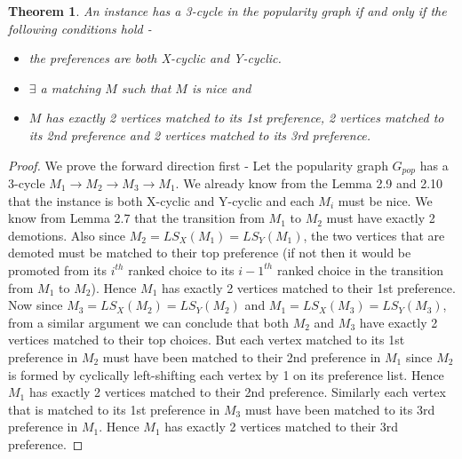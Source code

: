 \documentclass[a4paper,10pt]{article}
\theoremstyle{plain} %
\newtheorem{theorem}{Theorem}[section] %
\theoremstyle{plain} %
\begin{document}
\begin{theorem}
    An instance has a 3-cycle in the popularity graph if and only if the following conditions hold - 
    \begin{itemize}
        \item the preferences are both X-cyclic and Y-cyclic.
        \item $\exists$ a matching $M$ such that $M$ is nice and
        \item $M$ has exactly 2 vertices matched to its 1st preference, 2 vertices matched to its 2nd preference and 2 vertices matched to its 3rd preference.
    \end{itemize}
\end{theorem}

\begin{proof}
    We prove the forward direction first - Let the popularity graph $G_{pop}$ has a 3-cycle $M_1 \rightarrow M_2 \rightarrow M_3 \rightarrow M_1$. We already know from the Lemma 2.9 and 2.10 that the instance is both X-cyclic and Y-cyclic and each $M_i$ must be nice.
    We know from Lemma 2.7 that the transition from $M_1$ to $M_2$ must have exactly 2 demotions. Also since $M_2 = LS_X(M_1) = LS_Y(M_1)$, the two vertices that are demoted must be matched to their top preference (if not then it would be promoted from its $i^{th}$ ranked choice to its $i-1^{th}$ ranked choice in the transition from $M_1$ to $M_2$). Hence $M_1$ has exactly 2 vertices matched to their 1st preference. Now since $M_3 = LS_X(M_2) = LS_Y(M_2)$ and $M_1 = LS_X(M_3) = LS_Y(M_3)$, from a similar argument we can conclude that both $M_2$ and $M_3$ have exactly 2 vertices matched to their top choices. But each vertex matched to its 1st preference in $M_2$ must have been matched to their 2nd preference in $M_1$ since $M_2$ is formed by cyclically left-shifting each vertex by 1 on its preference list. Hence $M_1$ has exactly 2 vertices matched to their 2nd preference. Similarly each vertex that is matched to its 1st preference in $M_3$ must have been matched to its 3rd preference in $M_1$. Hence $M_1$ has exactly 2 vertices matched to their 3rd preference.


\end{proof}
\end{document}
